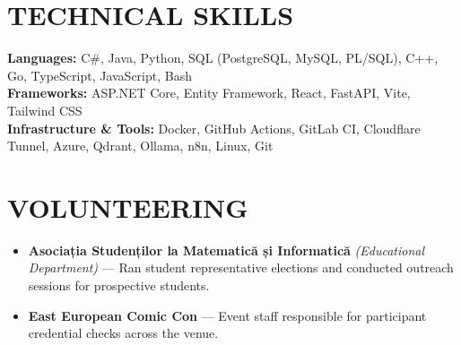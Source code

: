 \documentclass[10pt, letterpaper]{article}
\begin{document}
\section*{TECHNICAL SKILLS}
\textbf{Languages:} C\#, Java, Python, SQL (PostgreSQL, MySQL, PL/SQL), C++, Go, TypeScript, JavaScript, Bash \\
\textbf{Frameworks:} ASP.NET Core, Entity Framework, React, FastAPI, Vite, Tailwind CSS \\
\textbf{Infrastructure \& Tools:} Docker, GitHub Actions, GitLab CI, Cloudflare Tunnel, Azure, Qdrant, Ollama, n8n, Linux, Git

\section*{VOLUNTEERING}
\begin{itemize}
  \item \textbf{Asociația Studenților la Matematică și Informatică} \textit{(Educational Department)} --- Ran student representative elections and conducted outreach sessions for prospective students.
  \item \textbf{East European Comic Con} --- Event staff responsible for participant credential checks across the venue.
\end{itemize}
\end{document}
